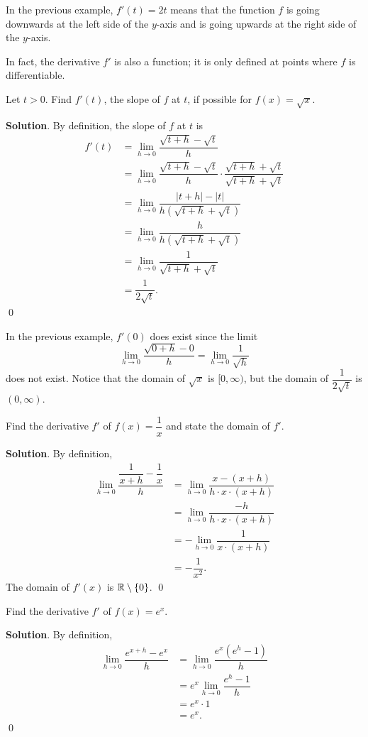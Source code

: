 \documentclass[11pt]{book}
\begin{document}
In the previous example, $f'(t)=2t$ means that the function $f$ is going downwards at the left side of the $y$-axis and is going upwards at the right side of the $y$-axis.

In fact, the derivative $f'$ is also a function; it is only defined at points where $f$ is differentiable.

\begin{example}
    Let $t>0$. Find $f'(t)$, the slope of $f$ at $t$, if possible for $f(x)=\sqrt{x}$.
\end{example}
\textbf{Solution}. By definition, the slope of $f$ at $t$ is \begin{align*}
    f'(t)&=\lim_{h\to 0}\dfrac{\sqrt{t+h}-\sqrt{t}}{h}\\
    &=\lim_{h\to 0}\dfrac{\sqrt{t+h}-\sqrt{t}}{h}\cdot\dfrac{\sqrt{t+h}+\sqrt{t}}{\sqrt{t+h}+\sqrt{t}}\\
    &=\lim_{h\to 0}\dfrac{|t+h|-|t|}{h(\sqrt{t+h}+\sqrt{t})}\\
    &=\lim_{h\to 0}\dfrac{h}{h(\sqrt{t+h}+\sqrt{t})}\\
    &=\lim_{h\to 0}\dfrac{1}{\sqrt{t+h}+\sqrt{t}}\\
    &=\dfrac{1}{2\sqrt{t}}.
\end{align*} \qed

\begin{remark}
    In the previous example, $f'(0)$ does exist since the limit $$\lim_{h\to 0}\dfrac{\sqrt{0+h}-0}{h}=\lim_{h\to 0}\dfrac{1}{\sqrt{h}}$$ does not exist. Notice that the domain of $\sqrt{x}$ is $[0, \infty)$, but the domain of $\dfrac{1}{2\sqrt{t}}$ is $(0, \infty)$.
\end{remark}

\begin{example}
    Find the derivative $f'$ of $f(x)=\dfrac{1}{x}$ and state the domain of $f'$.
\end{example}
\textbf{Solution}. By definition, \begin{align*}
    \lim_{h\to 0}\dfrac{\dfrac{1}{x+h}-\dfrac{1}{x}}{h}&=\lim_{h\to 0}\dfrac{x-(x+h)}{h\cdot x\cdot(x+h)}\\
    &=\lim_{h\to 0}\dfrac{-h}{h\cdot x\cdot (x+h)}\\
    &=-\lim_{h\to 0}\dfrac{1}{x\cdot(x+h)}\\
    &=-\dfrac{1}{x^2}.
\end{align*} The domain of $f'(x)$ is $\mathbb{R}\setminus\{0\}$. \qed

\begin{example}
    Find the derivative $f'$ of $f(x)=e^x$.
\end{example}
\textbf{Solution}. By definition, \begin{align*}
    \lim_{h\to 0}\dfrac{e^{x+h}-e^x}{h}&=\lim_{h\to 0}\dfrac{e^x(e^h-1)}{h}\\
    &=e^x\lim_{h\to 0}\dfrac{e^h-1}{h}\\
    &=e^x\cdot 1\\
    &=e^x.
\end{align*} \qed
\end{document}

